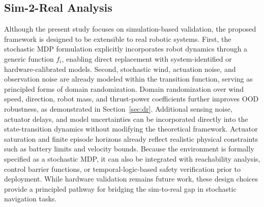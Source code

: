 \documentclass[letterpaper, 10 pt, conference]{ieeeconf}  %
\begin{document}
\subsection{Sim-2-Real Analysis}
Although the present study focuses on simulation-based validation, the proposed framework is designed to be extensible to real robotic systems. First, the stochastic MDP formulation explicitly incorporates robot dynamics through a generic function $f_i$, enabling direct replacement with system-identified or hardware-calibrated models. Second, stochastic wind, actuation noise, and observation noise are already modeled within the transition function, serving as principled forms of domain randomization. Domain randomization over wind speed, direction, robot mass, and thrust-power coefficients further improves OOD robustness, as demonstrated in Section~\ref{sec:dr}. Additional sensing noise, actuator delays, and model uncertainties can be incorporated directly into the state-transition dynamics without modifying the theoretical framework. Actuator saturation and finite episode horizons already reflect realistic physical constraints such as battery limits and velocity bounds. Because the environment is formally specified as a stochastic MDP, it can also be integrated with reachability analysis, control barrier functions, or temporal-logic-based safety verification prior to deployment. While hardware validation remains future work, these design choices provide a principled pathway for bridging the sim-to-real gap in stochastic navigation tasks.
\end{document}
